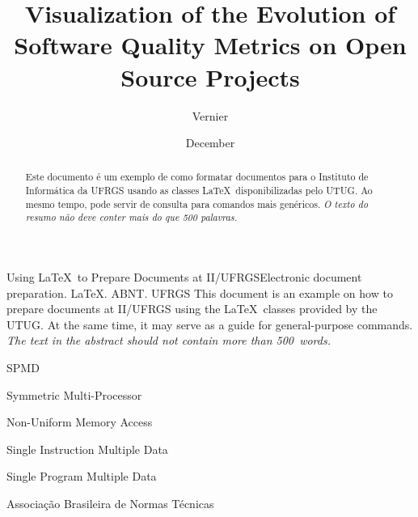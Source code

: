 \documentclass[cic,tc,english]{iiufrgs}
\title{Visualization of the Evolution of Software Quality Metrics on Open Source Projects}
\author{Vernier}{Eduardo Faccin}
\date{December}{2016}
\begin{document}
\maketitle





\begin{abstract}
    Este documento é um exemplo de como formatar documentos para o
    Instituto de Informática da UFRGS usando as classes \LaTeX\
    disponibilizadas pelo UTUG\@. Ao mesmo tempo, pode servir de consulta
    para comandos mais genéricos. \emph{O texto do resumo não deve
      conter mais do que 500 palavras.}
\end{abstract}

\begin{englishabstract}{Using \LaTeX\ to Prepare Documents at II/UFRGS}{Electronic document preparation. \LaTeX. ABNT. UFRGS}
    This document is an example on how to prepare documents at II/UFRGS
    using the \LaTeX\ classes provided by the UTUG\@. At the same time, it
    may serve as a guide for general-purpose commands. \emph{The text in
      the abstract should not contain more than 500~words.}
\end{englishabstract}

\listoffigures

\listoftables

\begin{listofabbrv}{SPMD}
    \item[SMP] Symmetric Multi-Processor
    \item[NUMA] Non-Uniform Memory Access
    \item[SIMD] Single Instruction Multiple Data
    \item[SPMD] Single Program Multiple Data
    \item[ABNT] Associação Brasileira de Normas Técnicas
\end{listofabbrv}
\end{document}
